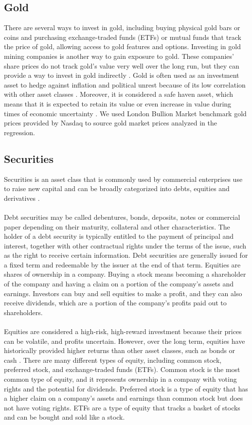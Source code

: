 \documentclass{article}
\begin{document}
\subsection{Gold}
There are several ways to invest in gold, including buying physical gold bars or coins and purchasing exchange-traded funds (ETFs) or mutual funds that track the price of gold, allowing access to gold features and options. Investing in gold mining companies is another way to gain exposure to gold. These companies' share prices do not track gold's value very well over the long run, but they can provide a way to invest in gold indirectly \cite{investopediaInvestGold}. Gold is often used as an investment asset to hedge against inflation and political unrest because of its low correlation with other asset classes \cite{investopediaAssetClasses}. Moreover, it is considered a safe haven asset, which means that it is expected to retain its value or even increase in value during times of economic uncertainty \cite{key}.
We used London Bullion Market benchmark gold prices provided by Nasdaq to source gold market prices analyzed in the regression.

\subsection{Securities}
Securities is an asset class that is commonly used by commercial enterprises use to raise new capital and can be broadly categorized into debts, equities and derivatives \cite{wikipediaSecurityfinance}.  
\\~\\
Debt securities may be called debentures, bonds, deposits, notes or commercial paper depending on their maturity, collateral and other characteristics. The holder of a debt security is typically entitled to the payment of principal and interest, together with other contractual rights under the terms of the issue, such as the right to receive certain information. Debt securities are generally issued for a fixed term and redeemable by the issuer at the end of that term. Equities are shares of ownership in a company. Buying a stock means becoming a shareholder of the company and having a claim on a portion of the company's assets and earnings. Investors can buy and sell equities to make a profit, and they can also receive dividends, which are a portion of the company's profits paid out to shareholders. 
\\~\\
Equities are considered a high-risk, high-reward investment because their prices can be volatile, and profits uncertain. However, over the long term, equities have historically provided higher returns than other asset classes, such as bonds or cash \cite{smartassetWhatEquities}. There are many different types of equity, including common stock, preferred stock, and exchange-traded funds (ETFs). Common stock is the most common type of equity, and it represents ownership in a company with voting rights and the potential for dividends. Preferred stock is a type of equity that has a higher claim on a company's assets and earnings than common stock but does not have voting rights. ETFs are a type of equity that tracks a basket of stocks and can be bought and sold like a stock.
\end{document}
